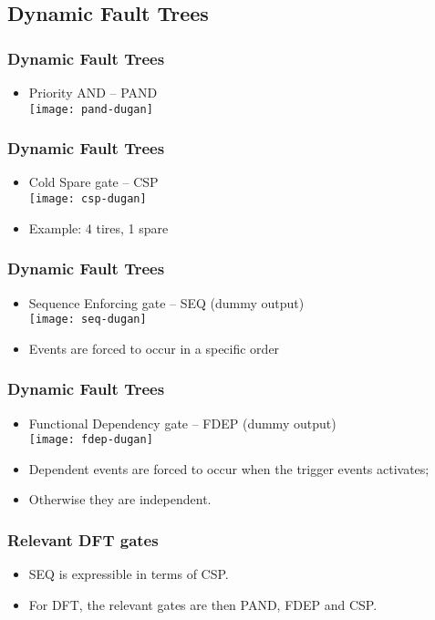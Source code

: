 \subsection{Dynamic Fault Trees}

\begin{frame}
\frametitle{Dynamic Fault Trees}
\begin{itemize}
  \item Priority AND -- PAND\\
    \texttt{[image: pand-dugan]}
\end{itemize}
\end{frame}

\begin{frame}
\frametitle{Dynamic Fault Trees}
\begin{itemize}
  \item Cold Spare gate -- CSP\\
    \texttt{[image: csp-dugan]}
  \item Example: 4 tires, 1 spare
\end{itemize}
\end{frame}

\begin{frame}
\frametitle{Dynamic Fault Trees}
\begin{itemize}
  \item Sequence Enforcing gate -- SEQ (dummy output)\\
    \texttt{[image: seq-dugan]} 
  \item Events are forced to occur in a specific order
\end{itemize}
\end{frame}

\begin{frame}
\frametitle{Dynamic Fault Trees}
\begin{itemize}
  \item Functional Dependency gate -- FDEP (dummy output)\\
    \texttt{[image: fdep-dugan]}
  \item Dependent events are forced to occur when the trigger events activates;
  \item Otherwise they are independent.
\end{itemize}
\end{frame}

\begin{frame}
\frametitle{Relevant DFT gates}
\begin{itemize}
  \item SEQ is expressible in terms of CSP.
  \item For DFT, the relevant gates are then PAND, FDEP and CSP. 
\end{itemize}
\end{frame}

